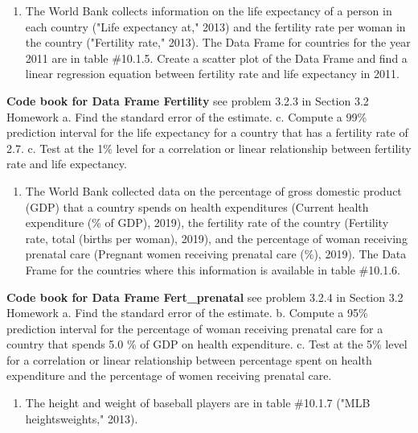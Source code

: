 \documentclass[]{book}
\providecommand{\tightlist}{%
  \setlength{\itemsep}{0pt}\setlength{\parskip}{0pt}}
\begin{document}
\begin{enumerate}
\def\labelenumi{\arabic{enumi}.}
\setcounter{enumi}{2}
\tightlist
\item
  The World Bank collects information on the life expectancy of a person in each country ("Life expectancy at," 2013) and the fertility rate per woman in the country ("Fertility rate," 2013). The Data Frame for countries for the year 2011 are in table \#10.1.5. Create a scatter plot of the Data Frame and find a linear regression equation between fertility rate and life expectancy in 2011.
\end{enumerate}

\textbf{Code book for Data Frame Fertility} see problem 3.2.3 in Section 3.2 Homework
a. Find the standard error of the estimate.
c. Compute a 99\% prediction interval for the life expectancy for a country that has a fertility rate of 2.7.
c. Test at the 1\% level for a correlation or linear relationship between fertility rate and life expectancy.

\begin{enumerate}
\def\labelenumi{\arabic{enumi}.}
\setcounter{enumi}{3}
\tightlist
\item
  The World Bank collected data on the percentage of gross domestic product (GDP) that a country spends on health expenditures (Current health expenditure (\% of GDP), 2019), the fertility rate of the country (Fertility rate, total (births per woman), 2019), and the percentage of woman receiving prenatal care (Pregnant women receiving prenatal care (\%), 2019). The Data Frame for the countries where this information is available in table \#10.1.6.
\end{enumerate}

\textbf{Code book for Data Frame Fert\_prenatal} see problem 3.2.4 in Section 3.2 Homework
a. Find the standard error of the estimate.
b. Compute a 95\% prediction interval for the percentage of woman receiving prenatal care for a country that spends 5.0 \% of GDP on health expenditure.
c. Test at the 5\% level for a correlation or linear relationship between percentage spent on health expenditure and the percentage of women receiving prenatal care.

\begin{enumerate}
\def\labelenumi{\arabic{enumi}.}
\setcounter{enumi}{4}
\tightlist
\item
  The height and weight of baseball players are in table \#10.1.7 ("MLB heightsweights," 2013).
\end{enumerate}
\end{document}
